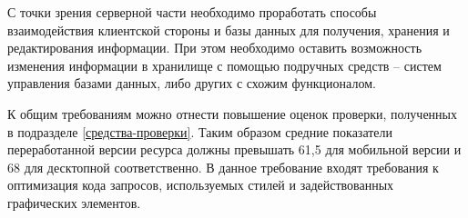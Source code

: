 С точки зрения серверной части необходимо проработать способы взаимодействия клиентской стороны и базы данных для получения, хранения и редактирования информации.
При этом необходимо оставить возможность изменения информации в хранилище с помощью подручных средств -- систем управления базами данных, либо других с схожим функционалом.

К общим требованиям можно отнести повышение оценок проверки, полученных в подразделе \ref{средства-проверки}.
Таким образом средние показатели переработанной версии ресурса должны превышать  61,5 для мобильной версии и 68 для десктопной соответственно.
В данное требование входят требования к оптимизация кода запросов, используемых стилей и задействованных графических элементов.

\clearpage
